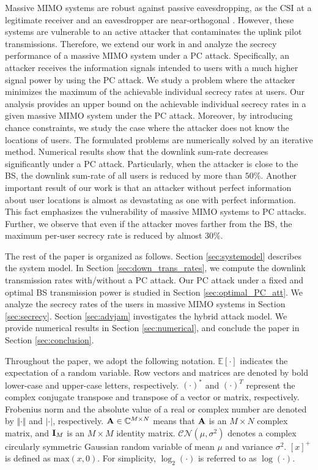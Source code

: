 \documentclass[draftclsnofoot, 12pt, onecolumn, journal]{IEEEtran}
\newcommand{\Am}{{\bf A}}
\newcommand{\Id}{{\bf I}}
\begin{document}
Massive MIMO systems are robust against passive eavesdropping, as the CSI at a legitimate receiver and an eavesdropper are near-orthogonal \cite{Kapetanovic2015}.
However, these systems are vulnerable to an active attacker that contaminates the uplink pilot transmissions.
Therefore, we extend our work in \cite{CNS17_Berk} and analyze the secrecy performance of a massive MIMO system under a PC attack.
Specifically, an attacker receives the information signals intended to users with a much higher signal power by using the PC attack.
We study a problem where the attacker minimizes the maximum of the achievable individual secrecy rates at users.
Our analysis provides an upper bound on the achievable individual secrecy rates in a given massive MIMO system under the PC attack.
Moreover, by introducing chance constraints, we study the case where the attacker does not know the locations of users.
The formulated problems are numerically solved by an iterative method.
Numerical results show that the downlink sum-rate decreases significantly under a PC attack. 
Particularly, when the attacker is close to the BS, the downlink sum-rate of all users is reduced by more than $50\%$.
Another important result of our work is that an attacker without perfect information about user locations is almost as devastating as one with perfect information.
This fact emphasizes the vulnerability of massive MIMO systems to PC attacks. 
Further, we observe that even if the attacker moves farther from the BS, the maximum per-user secrecy rate is reduced by almost $30\%$.

The rest of the paper is organized as follows.
Section \ref{sec:systemodel} describes the system model.
In Section \ref{sec:down_trans_rates}, we compute the downlink transmission rates with/without a PC attack.
Our PC attack under a fixed and optimal BS transmission power is studied in Section \ref{sec:optimal_PC_att}.
We analyze the secrecy rates of the users in massive MIMO systems in Section \ref{sec:secrecy}.
Section \ref{sec:advjam} investigates the hybrid attack model.
We provide numerical results in Section \ref{sec:numerical}, and conclude the paper in Section \ref{sec:conclusion}.

Throughout the paper, we adopt the following notation.
$ \mathbb{E}[\cdot] $ indicates the expectation of a random variable.
Row vectors and matrices are denoted by bold lower-case and upper-case letters, respectively.
$ (\cdot)^{*} $ and  $ (\cdot)^{T} $ represent the complex conjugate transpose and transpose of a vector or matrix, respectively.
Frobenius norm and the absolute value of a real or complex number are denoted by $ \Vert \cdot \Vert $ and $ \vert \cdot \vert $, respectively.
$ \Am \in \mathbb{C}^{M \times N} $ means that $ \Am $ is an $ M \times N $ complex matrix, and $\Id_M$ is an $M \times M$ identity matrix.
$ \mathcal{C} \mathcal{N}(\mu, \sigma^{2}) $ denotes a complex circularly symmetric Gaussian random variable of mean $ \mu $ and variance $ \sigma^{2} $.
$[x]^{+}$ is defined as $\mathrm{max}(x, 0)$.
For simplicity, $\log_2(\cdot)$ is referred to as $\log(\cdot)$.
\end{document}
